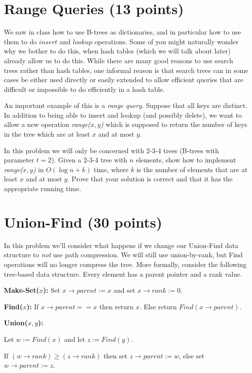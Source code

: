 \documentclass[11pt]{article}
\begin{document}
\section{Range Queries (13 points)}
We saw in class how to use B-trees as dictionaries, and in particular how to use them to do $insert$ and $lookup$ operations.  Some of you might naturally wonder why we bother to do this, when hash tables (which we will talk about later) already allow us to do this. While there are many good reasons to use search trees rather than hash tables, one informal reason is that search trees can in some cases be either used directly or easily extended to allow efficient queries that are difficult or impossible to do efficiently in a hash table.  

An important example of this is a \emph{range query}.  Suppose that all keys are distinct.  In addition to being able to insert and lookup (and possibly delete), we want to allow a new operation \emph{range($x,y$)} which is supposed to return the number of keys in the tree which are at least $x$ and at most $y$.

In this problem we will only be concerned with 2-3-4 trees (B-trees with parameter $t = 2$). Given a 2-3-4 tree with $n$ elements, show how to implement \emph{range($x,y$)} in $O(\log n + k)$ time, where $k$ is the number of elements that are at least $x$ and at most $y$. Prove that your solution is correct and that it has the appropriate running time.


\section{Union-Find (30 points)}

In this problem we'll consider what happens if we change our Union-Find data structure to \emph{not} use path compression.  We will still use union-by-rank, but Find operations will no longer compress the tree.  More formally, consider the following tree-based data structure.  Every element has a parent pointer and a rank value.

\textbf{Make-Set($x$):} Set $x \rightarrow parent := x$ and set $x \rightarrow rank := 0$.  

\textbf{Find($x$):} If $x \rightarrow parent == x$ then return $x$.  Else return $Find(x \rightarrow parent)$.

\textbf{Union($x, y$):} 

\qquad Let $w := Find(x)$ and let $z := Find(y)$.  

\qquad If $(w \rightarrow rank) \geq (z \rightarrow rank)$ then set $z \rightarrow parent := w$, else set $w \rightarrow parent := z$.  
\end{document}
